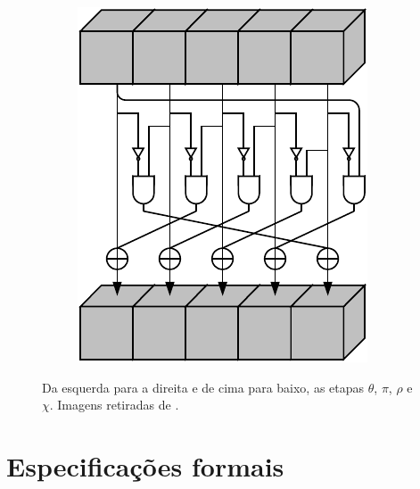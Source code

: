 \documentclass{article}
\begin{document}
\begin{itemize}
\begin{figure}[H]
\begin{subfigure}{.5\textwidth}
    \end{subfigure}%
    \begin{subfigure}{.5\textwidth}
        \centering
        \includegraphics[scale=0.65]{images/chi_step}
    \end{subfigure}
    \caption{Da esquerda para a direita e de cima para baixo, as etapas
    $\theta$, $\pi$, $\rho$ e $\chi$. Imagens retiradas de
    \cite{KeccakReference}.}
    \label{fig:steps}
\end{figure}

\end{itemize}

\section{Especificações formais}
\end{document}

